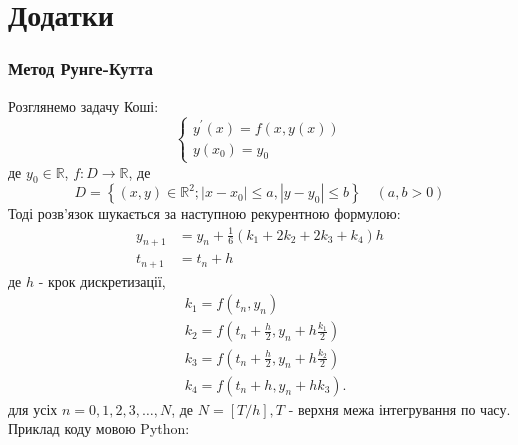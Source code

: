 \documentclass[a4paper,12pt]{extreport}
\begin{document}
\chapter*{Додатки}
 
\subsection*{Метод Рунге-Кутта}
    Розглянемо задачу Коші:
    $$
    \left\{\begin{array}{l}
    y^{\prime}(x)=f(x, y(x)) \\
    y\left(x_0\right)=y_0
    \end{array}\right.
    $$
    де $y_0 \in \mathbb{R}$, $f: D \rightarrow \mathbb{R}$, де 
    $$
    D=\left\{(x, y) \in \mathbb{R}^2 ;\left|x-x_0\right| \leq a,\left|y-y_0\right| \leq b\right\} \quad(a, b>0)
    $$
    Тоді розв'язок шукається за наступною рекурентною формулою:
    $$
    \begin{aligned}
    y_{n+1} &=y_n+\frac{1}{6}\left(k_1+2 k_2+2 k_3+k_4\right) h \\
    t_{n+1} &=t_n+h
    \end{aligned}
    $$
    де $h$ - крок дискретизації,
    $$
    \begin{aligned}
    &k_1=f\left(t_n, y_n\right) \\
    &k_2=f\left(t_n+\frac{h}{2}, y_n+h \frac{k_1}{2}\right) \\
    &k_3=f\left(t_n+\frac{h}{2}, y_n+h \frac{k_2}{2}\right) \\
    &k_4=f\left(t_n+h, y_n+h k_3\right) .
    \end{aligned}
    $$
    для усіх $n=0,1,2,3, \ldots, N$, де $N = [T/h], T$  - верхня межа інтегрування по часу.
    \newpage
    Приклад коду мовою Python:
\end{document}
